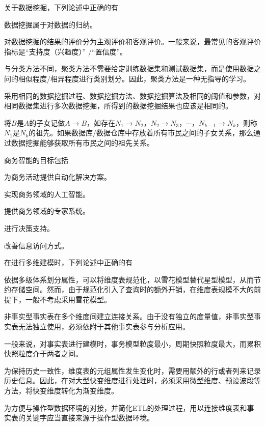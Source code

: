 \begin{problem}
关于数据挖掘，下列论述中正确的有
\myline
\begin{compactenum}[A.]
    \item 数据挖掘属于对数据的归纳。
    \item 对数据挖掘的结果的评价分为主观评价和客观评价。一般来说，最常见的客观评价指标是“支持度（兴趣度）” /“置信度”。
    \item 与分类方法不同，聚类方法不需要给定训练数据集和测试数据集，而是使用数据之问的相似程度/相异程度进行类别划分。因此，聚类方法是一种无指导的学习。
    \item 采用相同的数据挖掘过程、数据挖掘方法、数据挖掘算法及相同的阈值和参数，对相同数据集进行多次数据挖掘，所得到的数据挖掘结果也应该是相同的。
    \item 将$B$是$A$的子女记做$A \rightarrow B$，如存在$N_1 \rightarrow N_2$，$N_2 \rightarrow N_3$，$\cdots$，$N_{k-1} \rightarrow N_k$，则称$N_1$是$N_k$的祖先。如果数据库/数据仓库中存放着所有市民之间的子女关系，那么通过数据挖掘能够获取所有市民之间的祖先关系。
\end{compactenum}
\end{problem}


\begin{problem}
商务智能的目标包括
\myline
\begin{compactenum}[A.]
    \item 为商务活动提供自动化解决方案。
    \item 实现商务领域的人工智能。
    \item 提供商务领域的专家系统。
    \item 进行决策支持。
    \item 改善信息访问方式。
\end{compactenum}
\end{problem}


\begin{problem}
在进行多维建模时，下列论述中正确的有
\myline
\begin{compactenum}[A.]
    \item 依据多级体系划分属性，可以将维度表规范化，以雪花模型替代星型模型，从而节约存储空间。然而，由于规范化引入了查询时的额外开销，在维度表规模不大的前提下，一般不考虑采用雪花模型。
    \item 非事实型事实表在多个维度间建立连接关系。由于没有独立的度量值，非事实型事实表无法独立使用，必须依附于其他事实表参与分析应用。
    \item 一般来说，对事实表进行建模时，事务模型粒度最小，周期快照粒度最大，而累积快照粒度介于两者之间。
    \item 为保持历史一致性，维度表的元组属性发生变化时，需要用额外的行或者列来记录历史信息。因此，在对大型快变维度进行处理时，必须采用微型维度、预设波段等方法，将快变维度转化为渐变维度。
    \item 为方便与操作型数据环境的对接，并简化ETL的处理过程，用以连接维度表和事实表的关键字应当直接来源于操作型数据环境。
\end{compactenum}
\end{problem}



